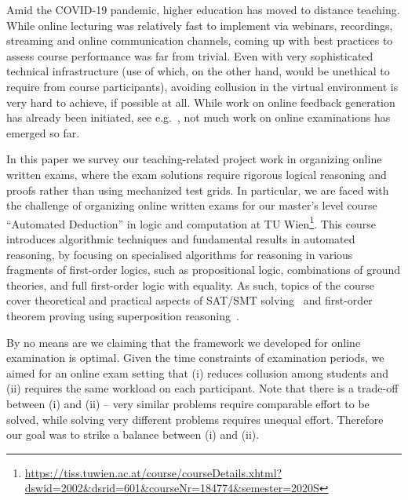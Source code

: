 Amid the COVID-19 pandemic, higher education has moved to distance
teaching. While online lecturing was relatively fast to implement via
webinars, recordings,  streaming and online communication channels,
coming up with best practices to assess course performance was far
from trivial. Even with very sophisticated technical infrastructure
(use of which, on the other hand, would be unethical to require from course
participants), avoiding collusion in the virtual
environment is very hard to achieve, if possible at all.
While work on
online feedback generation has already been initiated, see
e.g.~\cite{Zuleger18,Wang18}, 
not much work on online examinations has emerged so far.

In this paper we survey our teaching-related project work in organizing online
written exams, where the exam solutions require rigorous
logical reasoning and proofs rather than using mechanized test grids.
In particular, we are faced with the challenge of organizing online
written exams for our master's level course ``Automated
Deduction'' in logic and computation at TU
Wien\footnote{\url{https://tiss.tuwien.ac.at/course/courseDetails.xhtml?dswid=2002\&dsrid=601\&courseNr=184774\&semester=2020S}}.
This course introduces algorithmic techniques and fundamental results
in automated reasoning, by focusing on specialised algorithms for
reasoning in various fragments of first-order logics, such as
propositional logic, combinations of ground theories, and full
first-order logic with equality.
As such, topics of the course cover theoretical and practical
aspects of SAT/SMT solving~\cite{DPLL,Tinelli02,DPLLT} and first-order theorem proving using
superposition reasoning~\cite{Rubio01,Vampire13}.

By no means are we claiming that the framework we developed for online
examination is optimal.
Given the time constraints of examination periods, we aimed for an
online exam setting that (i) reduces collusion among students and  (ii)
requires the same workload on each participant.
Note that there is a trade-off between (i) and (ii) -- very similar problems
require comparable effort to be solved, while solving very different problems
requires unequal effort. Therefore our goal was to strike a balance between
(i) and (ii).

